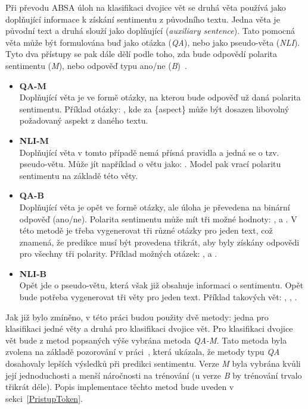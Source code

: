 Při převodu ABSA úloh na klasifikaci dvojice vět se druhá věta používá jako doplňující informace k získání sentimentu z původního textu. Jedna věta je původní text a druhá slouží jako doplňující (\emph{auxiliary sentence}). Tato pomocná věta může být formulována buď jako otázka (\emph{QA}), nebo jako pseudo-věta (\emph{NLI}). Tyto dva přístupy se pak dále dělí podle toho, zda bude odpovědí polarita sentimentu (\emph{M}), nebo odpověď typu ano/ne (\emph{B})~\cite{sun-etal-2019-utilizing}.
\begin{itemize}
    \item \textbf{QA-M} \\
    Doplňující věta je ve formě otázky, na kterou bude odpověď už daná polarita sentimentu. Příklad otázky: , kde za \{aspect\} může být dosazen libovolný požadovaný aspekt z daného textu.
    \item \textbf{NLI-M} \\
    Doplňující věta v tomto případě nemá přísná pravidla a jedná se o tzv. pseudo-větu. Může jít například o větu jako: . Model pak vrací polaritu sentimentu na základě této věty.
    \item \textbf{QA-B} \\
    Doplňující věta je opět ve formě otázky, ale úloha je převedena na binární odpověď (ano/ne). Polarita sentimentu může mít tři možné hodnoty: ,  a . V této metodě je třeba vygenerovat tři různé otázky pro jeden text, což znamená, že predikce musí být provedena třikrát, aby byly získány odpovědi pro všechny tři polarity. Příklad možných otázek: ,  a .
    \item \textbf{NLI-B} \\
    Opět jde o pseudo-větu, která však již obsahuje informaci o sentimentu. Opět bude potřeba vygenerovat tři věty pro jeden text. Příklad takových vět: , , .~\cite{sun-etal-2019-utilizing}
\end{itemize}

Jak již bylo zmíněno, v této práci budou použity dvě metody: jedna pro klasifikaci jedné věty a druhá pro klasifikaci dvojice vět. Pro klasifikaci dvojice vět bude z metod popsaných výše vybrána metoda \emph{QA-M}. Tato metoda byla zvolena na základě pozorování v práci~\cite{sun-etal-2019-utilizing}, která ukázala, že metody typu \emph{QA} dosahovaly lepších výsledků při predikci sentimentu. Verze \emph{M} byla vybrána kvůli její jednoduchosti a menší náročnosti na trénování (u verze \emph{B} by trénování trvalo třikrát déle). Popis implementace těchto metod bude uveden v sekci~\ref{PristupToken}.

